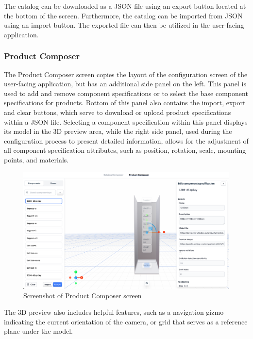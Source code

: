 The catalog can be downloaded as a JSON file using an export button located at the bottom of the screen. Furthermore, the catalog can be imported from JSON using an import button. The exported file can then be utilized in the user-facing application.


\subsubsection{Product Composer}

The Product Composer screen copies the layout of the configuration screen of the user-facing application, but has an additional side panel on the left. This panel is used to add and remove component specifications or to select the base component specifications for products. Bottom of this panel also contains the import, export and clear buttons, which serve to download or upload product specifications within a JSON file. Selecting a component specification within this panel displays its model in the 3D preview area, while the right side panel, used during the configuration process to present detailed information, allows for the adjustment of all component specification attributes, such as position, rotation, scale, mounting points, and materials.

\begin{figure}[h!]
\centering
\includegraphics[width=\textwidth]{images/screenshot_productcomposer.png}
\caption{Screenshot of Product Composer screen}
\label{fig:screenshot-produtcomposer}
\end{figure}

The 3D preview also includes helpful features, such as a navigation gizmo indicating the current orientation of the camera, or grid that serves as a reference plane under the model.


